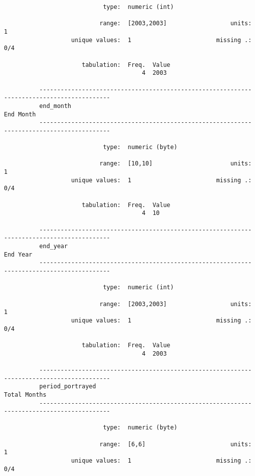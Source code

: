 \documentclass{article}
\begin{document}
\begin{verbatim}
                            type:  numeric (int)
          
                           range:  [2003,2003]                  units:  1
                   unique values:  1                        missing .:  0/4
          
                      tabulation:  Freq.  Value
                                       4  2003
          
          ------------------------------------------------------------------------------------------
          end_month                                                                        End Month
          ------------------------------------------------------------------------------------------
          
                            type:  numeric (byte)
          
                           range:  [10,10]                      units:  1
                   unique values:  1                        missing .:  0/4
          
                      tabulation:  Freq.  Value
                                       4  10
          
          ------------------------------------------------------------------------------------------
          end_year                                                                          End Year
          ------------------------------------------------------------------------------------------
          
                            type:  numeric (int)
          
                           range:  [2003,2003]                  units:  1
                   unique values:  1                        missing .:  0/4
          
                      tabulation:  Freq.  Value
                                       4  2003
          
          ------------------------------------------------------------------------------------------
          period_portrayed                                                              Total Months
          ------------------------------------------------------------------------------------------
          
                            type:  numeric (byte)
          
                           range:  [6,6]                        units:  1
                   unique values:  1                        missing .:  0/4
          

\end{verbatim}
\end{document}
